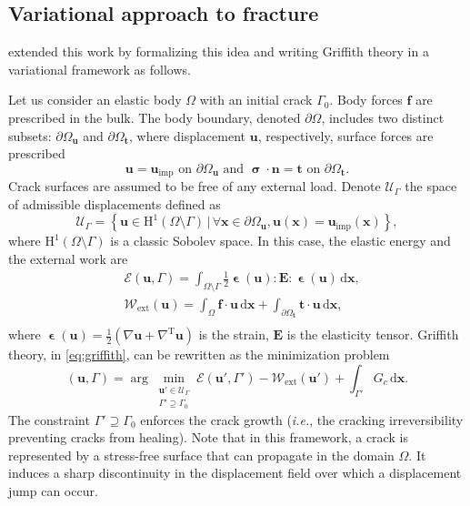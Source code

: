 \documentclass[OptSoft]{jtcam_preprint}
\newcommand{\xx}{\bm{x}}
\newcommand{\dx}{\,\mathrm{d}\xx}
\newcommand{\uu}{\bm{u}}
\newcommand{\uimp}{\uu_{\mathrm{imp}}}
\newcommand{\fv}{\bm{f}}
\newcommand{\ts}{\bm{t}}
\newcommand{\nn}{\bm{n}}
\newcommand{\ela}{\mathbf{E}}
\newcommand{\eps}{\bm{\upvarepsilon}}
\newcommand{\sig}{\bm{\upsigma}}
\begin{document}
\subsection{Variational approach to fracture}

\textcite{francfort_revisiting_1998} extended this work by formalizing this idea and writing Griffith theory in a variational framework as follows.

Let us consider an elastic body $\Omega$ with an initial crack $\Gamma_0$.
Body forces $\fv$ are prescribed in the bulk. 
The body boundary, denoted $\partial \Omega$, includes two distinct subsets: $\partial \Omega_{\uu}$ and $\partial \Omega_{\ts}$, where displacement $\uu$, respectively, surface forces are prescribed
\begin{equation}
    \uu=\uimp \text{ on }\partial \Omega_{\uu}
    \text{ and }
    \sig \cdot \nn = \ts \text{ on } \partial \Omega_{\ts}.
\end{equation}
Crack surfaces are assumed to be free of any external load.
Denote $\mathcal{U}_{\Gamma}$ the space of admissible displacements defined as
\begin{equation}
  \mathcal{U}_{\Gamma} = \left\{ \uu \in \mathrm{H}^1(\Omega \setminus \Gamma) \,\vert\, \forall \xx \in \partial \Omega_{\uu}, \uu(\xx) = \uimp(\xx) \right\},
\end{equation}
where  $\mathrm{H}^1(\Omega \setminus \Gamma)$ is a classic Sobolev space.
In this case, the elastic energy and the external work are
\begin{equation}
  \begin{split}
    &\mathcal{E}(\uu, \Gamma) = \int_{\Omega \setminus \Gamma}\frac{1}{2} \eps(\uu) : \ela : \eps(\uu) \dx
    , \\
    &\mathcal{W}_{\mathrm{ext}} (\uu) = \int_{\Omega} \fv \cdot \uu \dx + \int_{\partial \Omega_{\ts}} \ts \cdot \uu \dx
    , \\
  \end{split}
\end{equation}
where
  $\eps(\uu) = \frac{1}{2} (\nabla \uu + \nabla^{\mathrm{T}} \uu)$ is the strain,
  $\ela$ is the elasticity tensor.
Griffith theory, in \cref{eq:griffith}, can be rewritten as the minimization problem
\begin{equation}
  \label{eq:griffith_principle}
  (\uu, \Gamma) = \arg\min_{\substack{\uu' \in \mathcal{U}_{\Gamma} \\ \Gamma' \supseteq \Gamma_0}}
  \mathcal{E}(\uu', \Gamma') - \mathcal{W}_{\mathrm{ext}}(\uu') + \int_{\Gamma'} G_c \dx.
\end{equation}
The constraint $\Gamma' \supseteq \Gamma_0$ enforces the crack growth (\emph{i.e.}, the cracking irreversibility preventing cracks from healing).
Note that in this framework, a crack is represented by a stress-free surface that can propagate in the domain $\Omega$.
It induces a sharp discontinuity in the displacement field over which a displacement jump can occur.
\end{document}
